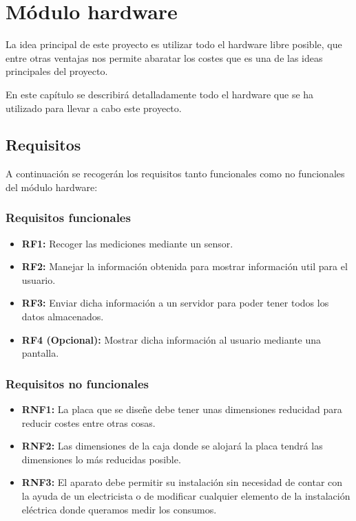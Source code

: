 \chapter{Módulo hardware}
La idea principal de este proyecto es utilizar todo el hardware libre posible, que entre otras ventajas nos permite abaratar los costes que es una de las ideas principales del proyecto.

En este capítulo se describirá detalladamente todo el hardware que se ha utilizado para llevar a cabo este proyecto.

\section{Requisitos}

A continuación se recogerán los requisitos tanto funcionales como no funcionales del módulo hardware:

\subsection{Requisitos funcionales}

\begin{itemize}
	\item\textbf{RF1: } Recoger las mediciones mediante un sensor.
	\item\textbf{RF2: } Manejar la información obtenida para mostrar información util para el usuario.
	\item\textbf{RF3: } Enviar dicha información a un servidor para poder tener todos los datos almacenados.
	\item\textbf{RF4 (Opcional): } Mostrar dicha información al usuario mediante una pantalla.
\end{itemize}

\subsection{Requisitos no funcionales}

\begin{itemize}
	\item\textbf{RNF1: } La placa que se diseñe debe tener unas dimensiones reducidad para reducir costes entre otras cosas.
	\item\textbf{RNF2: } Las dimensiones de la caja donde se alojará la placa tendrá las dimensiones lo más reducidas posible.
	\item\textbf{RNF3: } El aparato debe permitir su instalación sin necesidad de contar con la ayuda de un electricista o de modificar cualquier elemento de la instalación eléctrica donde queramos medir los consumos.
\end{itemize}

